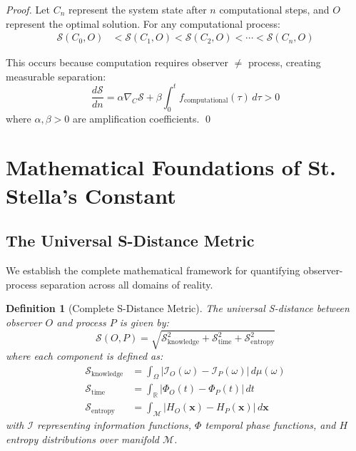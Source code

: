 \documentclass[12pt,a4paper]{article}
\newtheorem{definition}[theorem]{Definition}
\begin{document}
\begin{proof}
Let $C_n$ represent the system state after $n$ computational steps, and $O$ represent the optimal solution. For any computational process:
\begin{align}
\mathcal{S}(C_0, O) &< \mathcal{S}(C_1, O) < \mathcal{S}(C_2, O) < \cdots < \mathcal{S}(C_n, O)
\end{align}

This occurs because computation requires observer $\neq$ process, creating measurable separation:
\begin{equation}
\frac{d\mathcal{S}}{dn} = \alpha \nabla_C \mathcal{S} + \beta \int_0^t f_{\text{computational}}(\tau) \, d\tau > 0
\end{equation}
where $\alpha, \beta > 0$ are amplification coefficients. \qed
\end{proof}

\section{Mathematical Foundations of St. Stella's Constant}

\subsection{The Universal S-Distance Metric}

We establish the complete mathematical framework for quantifying observer-process separation across all domains of reality.

\begin{definition}[Complete S-Distance Metric]
The universal S-distance between observer $O$ and process $P$ is given by:
\begin{equation}
\mathcal{S}(O,P) = \sqrt{\mathcal{S}_{\text{knowledge}}^2 + \mathcal{S}_{\text{time}}^2 + \mathcal{S}_{\text{entropy}}^2}
\end{equation}
where each component is defined as:
\begin{align}
\mathcal{S}_{\text{knowledge}} &= \int_{\Omega} |\mathcal{I}_O(\omega) - \mathcal{I}_P(\omega)| \, d\mu(\omega) \\
\mathcal{S}_{\text{time}} &= \int_{\mathbb{R}} |\Phi_O(t) - \Phi_P(t)| \, dt \\
\mathcal{S}_{\text{entropy}} &= \int_{\mathcal{M}} |H_O(\mathbf{x}) - H_P(\mathbf{x})| \, d\mathbf{x}
\end{align}
with $\mathcal{I}$ representing information functions, $\Phi$ temporal phase functions, and $H$ entropy distributions over manifold $\mathcal{M}$.
\end{definition}
\end{document}
